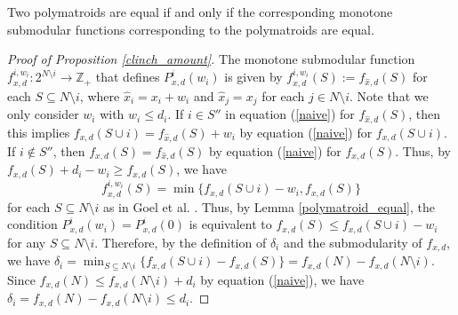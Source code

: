 \documentclass[letterpaper,11pt]{article}
\begin{document}
\begin{lemma}
\label{polymatroid_equal}
Two polymatroids are equal if and only if the corresponding monotone submodular functions corresponding to the polymatroids are equal.
\end{lemma}
\begin{proof}[Proof of Proposition \ref{clinch_amount}]
The monotone submodular function $f^{i, w_i}_{x,d}: 2^{N\setminus i}\to \mathbb Z_{+}$ that defines $P^i_{x,d}(w_i)$ is given by 
$f^{i, w_i}_{x,d}(S):=f_{\hat{x},d}(S)$ for each $S\subseteq N\setminus i$, 
where $\hat{x}_i=x_i+w_i$ and $\hat{x}_j=x_j$ 
for each $j\in N\setminus i$. Note that we only consider $w_i$ with $w_i\leq d_i$.
If $i\in S''$ in equation (\ref{naive}) for $f_{\hat{x},d}(S)$, 
then this implies $f_{x,d}(S\cup i)=f_{\hat{x},d}(S)+w_i$ by equation (\ref{naive}) for $f_{x,d}(S\cup i)$.
If $i\notin S''$, then $f_{x,d}(S)=f_{\hat{x},d}(S)$ by equation (\ref{naive}) for $f_{x,d}(S)$.
Thus, by $f_{x,d}(S)+d_i-w_i\geq f_{x,d}(S)$, we have 
\[
f^{i, w_i}_{x,d}(S)=\min\{f_{x,d}(S\cup i)-w_i, f_{x,d}(S)\}
\] 
for each $S\subseteq N\setminus i$ as in Goel et al. \cite{GMP2015}.
Thus, by Lemma \ref{polymatroid_equal}, 
the condition $P^i_{x,d}(w_i)=P^i_{x,d}(0)$ is equivalent to  
$f_{x,d}(S)\leq f_{x,d}(S\cup i)-w_i$ for any $S\subseteq N\setminus i$.
Therefore, by the definition of $\delta_i$ and the submodularity of $f_{x,d}$, we have
$\delta_i=\min_{S\subseteq N\setminus i} \{f_{x,d}(S\cup i)-f_{x,d}(S)\}=f_{x,d}(N)-f_{x,d}(N\setminus i)$. 
Since $f_{x,d}(N)\leq f_{x,d}(N\setminus i)+d_i$ by equation (\ref{naive}), 
we have $\delta_i=f_{x,d}(N)-f_{x,d}(N\setminus i)\leq d_i$.


\end{proof}
\end{document}
